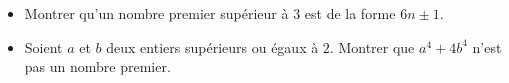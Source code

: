 \begin{itemize}
  \item Montrer qu'un nombre premier supérieur à $3$ est de la forme $6n \pm 1$.
  \item Soient $a$ et $b$ deux entiers supérieurs ou égaux à $2$. Montrer que
  $a^4 + 4b^4$ n'est pas un nombre premier.
\end{itemize}
